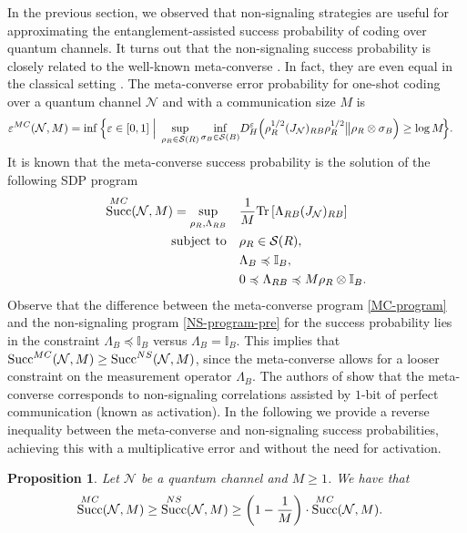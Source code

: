 \documentclass[a4paper,onecolumn,11pt,accepted=2025-10-01]{quantumarticle}
\newtheorem{prop}[theorem]{Proposition}
\DeclareMathOperator{\suc}{Succ}
\newcommand*{\cN}{\mathcal{N}}
\newcommand*{\cS}{\mathcal{S}}
\newcommand*{\eps}{\varepsilon}
\newcommand*{\tr}[1]{\mathrm{Tr}\left[#1\right]}
\newcommand*{\mle}{\preccurlyeq}
\begin{document}
In the previous section, we observed that non-signaling strategies are useful for approximating the entanglement-assisted success probability of coding over quantum channels. It turns out that the non-signaling success probability is closely related to the well-known meta-converse \cite{polyanskiy2010channel,matthews2012linear,Matthews2014Sep,Wang2019Feb}. In fact, they are even equal in the classical setting \cite{matthews2012linear}. 
The meta-converse error probability for one-shot coding over a quantum channel $\cN$ and with a communication size $M$ is \cite{Matthews2014Sep}
\begin{align}\label{eq:mc-hypothesis}
  & \eps_{}^{\rm{MC}}(\cN,M) =\inf_{} \Big\{ \eps\in[0,1] \;\Big|\; 
\sup_{\rho_{R} \in \cS(R)} \inf_{\sigma_B\in \cS(B)}\! D_H^{\eps}\!\left(\rho_R^{1/2}(J_\cN)_{RB}\rho_{R}^{1/2} \big\| \rho_R \otimes \sigma_B \right)\ge \log M \!\Big\}. 
\end{align}
It is known that the meta-converse success probability  is the solution of the following SDP program \cite{Matthews2014Sep,Wang2019Feb}
\begin{align}
    \suc^{\rm{MC}}(\cN, M) = \sup_{\rho_R, \Lambda_{RB}} \quad & \frac{1}{M} \tr{\Lambda_{RB} (J_{\cN})_{RB}} \notag \\
\text{subject to} \quad
& \rho_R \in \cS(R), \notag \\
& \Lambda_B \mle  \mathbb{I}_B, \notag \\
& 0 \mle \Lambda_{RB} \mle M \rho_R \otimes \mathbb{I}_B.\label{MC-program}
\end{align}
Observe that the difference between the meta-converse program \eqref{MC-program} and the non-signaling program \eqref{NS-program-pre} for the success probability lies in the constraint $\Lambda_B \mle  \mathbb{I}_B$ versus $\Lambda_B  =  \mathbb{I}_B$. This implies that $\suc^{\rm{MC}}(\cN, M)  \ge \suc^{\rm{NS}}(\cN, M)$,  since the meta-converse allows for a looser constraint on the measurement operator $\Lambda_B$. The authors of \cite{Wang2019Feb} show that the meta-converse corresponds to non-signaling correlations assisted by $1$-bit of perfect communication (known as activation). In the following we provide a reverse inequality between the meta-converse and non-signaling success probabilities, achieving this  with a multiplicative error and without the need for  activation.

\begin{prop}\label{prop:NSvsMC}
Let $\cN$ be a quantum channel and $M\ge 1$. 
    We have that 
    \begin{align}
        \suc^{\rm{MC}}(\cN,M)&\ge  \suc^{\rm{NS}}(\cN,M) 
        \ge \left(1-\frac{1}{M}\right)\cdot \suc^{\rm{MC}}(\cN,M).
    \end{align}
\end{prop}
\end{document}
